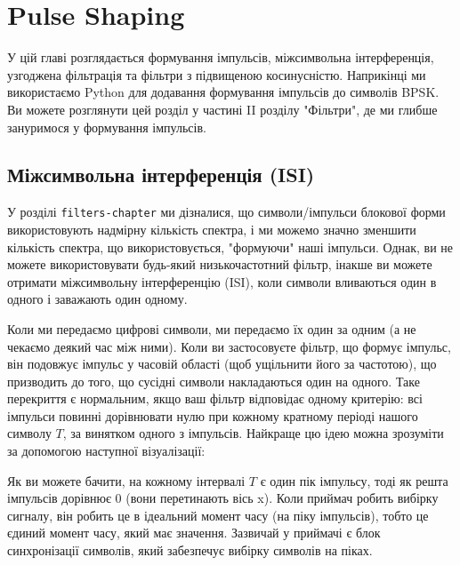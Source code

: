 \chapter{Pulse Shaping}\label{pulse-shaping-chapter}

У цій главі розглядається формування імпульсів, міжсимвольна
інтерференція, узгоджена фільтрація та фільтри з підвищеною
косинусністю. Наприкінці ми використаємо Python для додавання формування
імпульсів до символів BPSK. Ви можете розглянути цей розділ у частині II
розділу "Фільтри", де ми глибше зануримося у формування імпульсів.

\section{Міжсимвольна інтерференція
(ISI)}\label{ux43cux456ux436ux441ux438ux43cux432ux43eux43bux44cux43dux430-ux456ux43dux442ux435ux440ux444ux435ux440ux435ux43dux446ux456ux44f-isi}

У розділі \texttt{filters-chapter} ми дізналися, що символи/імпульси
блокової форми використовують надмірну кількість спектра, і ми можемо
значно зменшити кількість спектра, що використовується, "формуючи" наші
імпульси. Однак, ви не можете використовувати будь-який низькочастотний
фільтр, інакше ви можете отримати міжсимвольну інтерференцію (ISI), коли
символи вливаються один в одного і заважають один одному.

Коли ми передаємо цифрові символи, ми передаємо їх один за одним (а не
чекаємо деякий час між ними). Коли ви застосовуєте фільтр, що формує
імпульс, він подовжує імпульс у часовій області (щоб ущільнити його за
частотою), що призводить до того, що сусідні символи накладаються один
на одного. Таке перекриття є нормальним, якщо ваш фільтр відповідає
одному критерію: всі імпульси повинні дорівнювати нулю при кожному
кратному періоді нашого символу \(T\), за винятком одного з імпульсів.
Найкраще цю ідею можна зрозуміти за допомогою наступної візуалізації:

\href{../_images/pulse_train.svg}{}

Як ви можете бачити, на кожному інтервалі \(T\) є один пік імпульсу,
тоді як решта імпульсів дорівнює 0 (вони перетинають вісь x). Коли
приймач робить вибірку сигналу, він робить це в ідеальний момент часу
(на піку імпульсів), тобто це єдиний момент часу, який має значення.
Зазвичай у приймачі є блок синхронізації символів, який забезпечує
вибірку символів на піках.

